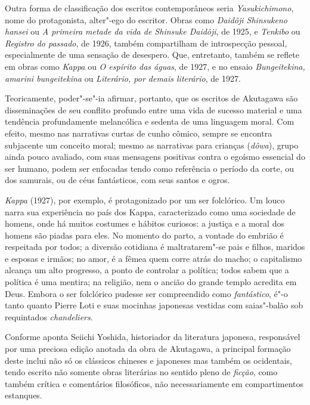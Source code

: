 Outra forma de classificação dos escritos contemporâneos seria
\textit{Yasukichimono}, nome do protagonista, alter"-ego do escritor. 
Obras como \textit{Daidôji Shinsukeno hansei} ou \textit{A primeira metade da vida de 
Shinsuke Daidôji}, de 1925, e \textit{Tenkibo} ou \textit{Registro do passado}, de 1926, também
compartilham de introspecção pessoal, especialmente de uma sensação de
desespero. Que, entretanto, também se reflete em obras como
\textit{Kappa} ou \textit{O espírito das águas}, de 1927, e no ensaio 
\textit{Bungeitekina, amarini bungeitekina} ou \textit{Literário, por demais literário}, de 1927. 

Teoricamente, poder"-se"-ia afirmar, portanto, que os escritos de
Akutagawa são disseminações de seu conflito profundo entre uma vida de
sucesso material e uma tendência profundamente melancólica e
sedenta de uma linguagem moral. Com efeito, mesmo nas narrativas curtas
de cunho cômico, sempre se encontra subjacente um conceito moral; mesmo
as narrativas para crianças (\textit{dôwa}), grupo ainda pouco
avaliado, com suas mensagens positivas contra o egoísmo essencial do
ser humano, podem ser enfocadas tendo como referência o período da corte, ou dos
samurais, ou de céus fantásticos, com seus santos e ogros.

\textit{Kappa} (1927), por exemplo, é protagonizado por 
um ser folclórico. Um louco narra sua experiência no
país dos Kappa, caracterizado como uma sociedade de homens, onde há
muitos costumes e hábitos curiosos: a justiça e a moral dos homens são
piadas para eles. No momento do parto, a vontade do embrião é
respeitada por todos; a diversão cotidiana é maltratarem"-se pais e
filhos, maridos e esposas e irmãos; no amor, é a fêmea quem corre atrás
do macho; o capitalismo alcança um alto progresso, a ponto de controlar
a política; todos sabem que a política é uma mentira; na religião, nem
o ancião do grande templo acredita em Deus. Embora o ser folclórico
pudesse ser compreendido como \textit{fantástico}, é"-o tanto quanto Pierre
Loti e suas mocinhas japonesas vestidas com saias"-balão sob requintados
\textit{chandeliers}.

Conforme aponta Seiichi Yoshida, historiador da literatura
japonesa, responsável por uma preciosa edição anotada da obra de Akutagawa, a
principal formação deste inclui não só os clássicos chineses e
japoneses mas também os ocidentais, tendo escrito não somente obras
literárias no sentido pleno de \textit{ficção}, como também crítica e
comentários filosóficos, não necessariamente em compartimentos estanques.

